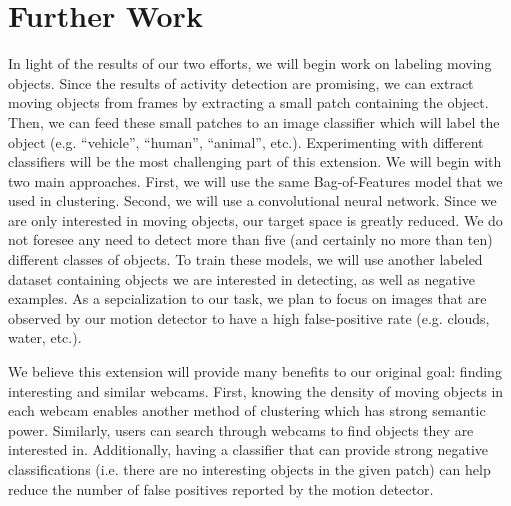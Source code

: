 \documentclass{article}
\begin{document}
\section{Further Work}
In light of the results of our two efforts, we will begin work on labeling
moving objects. Since the results of activity detection are promising, we can
extract moving objects from frames by extracting a small patch containing the
object. Then, we can feed these small patches to an image classifier which will
label the object (e.g. ``vehicle'', ``human'', ``animal'', etc.). Experimenting
with different classifiers will be the most challenging part of this extension.
We will begin with two main approaches. First, we will use the same
Bag-of-Features model that we used in clustering.  Second, we will use a
convolutional neural network. Since we are only interested in moving objects,
our target space is greatly reduced. We do not foresee any need to detect more
than five (and certainly no more than ten) different classes of objects. To
train these models, we will use another labeled dataset containing objects we
are interested in detecting, as well as negative examples. As a sepcialization
to our task, we plan to focus on images that are observed by our motion
detector to have a high false-positive rate (e.g. clouds, water, etc.).

We believe this extension will provide many benefits to our original goal:
finding interesting and similar webcams. First, knowing the density of moving
objects in each webcam enables another method of clustering which has strong
semantic power. Similarly, users can search through webcams to find objects
they are interested in. Additionally, having a classifier that can provide
strong negative classifications (i.e. there are no interesting objects in the
given patch) can help reduce the number of false positives reported by the
motion detector.

\newpage
\end{document}
